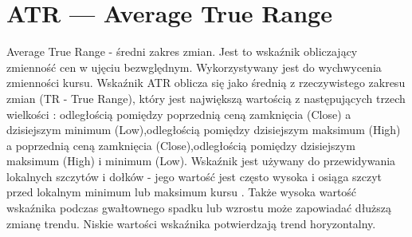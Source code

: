 \section{ATR --- Average True Range}
\label{sec:1ATR}

Average True Range - średni zakres zmian. Jest to wskaźnik obliczający zmienność cen w ujęciu bezwględnym.  Wykorzystywany jest do wychwycenia zmienności kursu. Wskaźnik ATR oblicza się jako średnią z rzeczywistego zakresu zmian (TR - True Range), który jest największą wartością z następujących trzech wielkości : odległością pomiędzy poprzednią ceną zamknięcia (Close) a dzisiejszym minimum (Low),odległością pomiędzy dzisiejszym maksimum (High) a poprzednią ceną zamknięcia (Close),odległością pomiędzy dzisiejszym maksimum (High) i minimum (Low). Wskaźnik jest używany do przewidywania lokalnych szczytów i dołków - jego wartość jest często wysoka i osiąga szczyt przed lokalnym minimum lub maksimum kursu . Także wysoka wartość wskaźnika podczas gwałtownego spadku lub wzrostu może zapowiadać dłuższą zmianę trendu. Niskie wartości wskaźnika potwierdzają trend horyzontalny.



\noindent

